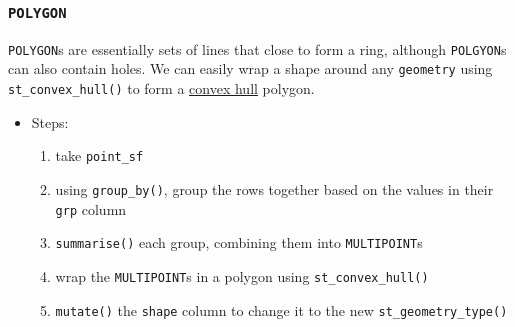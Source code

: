 \documentclass[
]{report}
\providecommand{\tightlist}{%
  \setlength{\itemsep}{0pt}\setlength{\parskip}{0pt}}
\begin{document}
\hypertarget{polygon}{%
\subsubsection{\texorpdfstring{\texttt{POLYGON}}{POLYGON}}\label{polygon}}

\texttt{POLYGON}s are essentially sets of lines that close to form a ring, although \texttt{POLGYON}s can also contain holes. We can easily wrap a shape around any \texttt{geometry} using \texttt{st\_convex\_hull()} to form a \href{https://en.wikipedia.org/wiki/Convex_hull}{convex hull} polygon.

\begin{itemize}
\tightlist
\item
  Steps:

  \begin{enumerate}
  \def\labelenumi{\arabic{enumi}.}
  \tightlist
  \item
    take \texttt{point\_sf}
  \item
    using \texttt{group\_by()}, group the rows together based on the values in their \texttt{grp} column
  \item
    \texttt{summarise()} each group, combining them into \texttt{MULTIPOINT}s
  \item
    wrap the \texttt{MULTIPOINT}s in a polygon using \texttt{st\_convex\_hull()}
  \item
    \texttt{mutate()} the \texttt{shape} column to change it to the new \texttt{st\_geometry\_type()}
  \end{enumerate}
\end{itemize}
\end{document}
